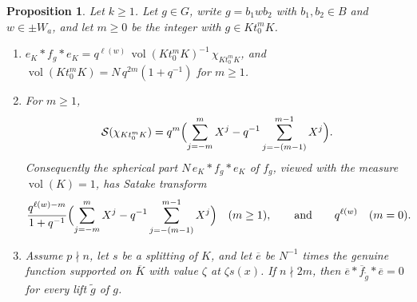 \documentclass[12pt,letterpaper]{amsart}
\numberwithin{equation}{section}
\newtheorem{proposition}[theorem]{Proposition}
\theoremstyle{definition}
\theoremstyle{remark}
\DeclareMathOperator{\vol}{vol}
\newcommand{\fbar}{\overline{f}}
\begin{document}
\begin{proposition}
\label{prop:spherical}
Let $k\geq 1$. Let $g\in G$, write $g=b_1wb_2$ with $b_1,b_2\in B$ and
$w\in\pm W_a$, and let $m\geq 0$ be the integer with $g\in Kt_0^mK$.
\begin{enumerate}[leftmargin=2em,label=(\alph*)]
\item $e_K*f_g*e_K=q^{\ell(w)}\,\vol(Kt_0^mK)^{-1}\,\chi_{Kt_0^mK}$, and
$\vol(Kt_0^mK)=N\,q^{2m}(1+q^{-1})$ for $m\geq 1$.
\item For $m\geq 1$,
\[
\mathcal S(\chi_{Kt_0^mK})=q^m\Bigl(\sum_{j=-m}^{m}X^j
-q^{-1}\sum_{j=-(m-1)}^{m-1}X^j\Bigr).
\]
Consequently the spherical part $N\,e_K*f_g*e_K$ of $f_g$, viewed with
the measure $\vol(K)=1$, has Satake transform
\[
\frac{q^{\ell(w)-m}}{1+q^{-1}}\Bigl(\sum_{j=-m}^{m}X^j
-q^{-1}\sum_{j=-(m-1)}^{m-1}X^j\Bigr)\quad(m\geq 1),
\qquad\mbox{and}\qquad q^{\ell(w)}\quad(m=0).
\]
\item Assume $p\nmid n$, let $s$ be a splitting of $K$, and let
$\overline e$ be $N^{-1}$ times the genuine function supported on
$\overline K$ with value $\zeta$ at $\zeta s(x)$. If $n\nmid 2m$, then
$\overline e*\fbar_{\tilde g}*\overline e=0$ for every lift $\tilde g$
of $g$.
\end{enumerate}
\end{proposition}
\end{document}
